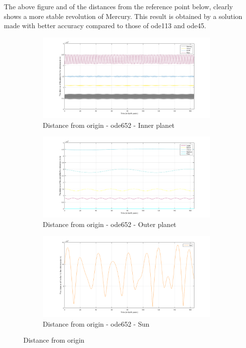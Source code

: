 \documentclass[a4paper]{article}
\begin{document}
The above figure and of the distances from the reference point below, clearly shows a more stable revolution of Mercury. This result is obtained by a solution made with better accuracy compared to those of ode113 and ode45.

\begin{figure}[H]
\centering
\begin{subfigure}{.5\textwidth}
\centering
\includegraphics[width=1\textwidth]{Solar_System_-_ode652_-_ip.png}
\caption{Distance from origin - ode652 - Inner planet}
\label{fig:Solar_System_-_ode652_-_ip}
\end{subfigure}%
\begin{subfigure}{.5\textwidth}
\centering
\includegraphics[width=1\textwidth]{Solar_System_-_ode652_-_op.png}
\caption{Distance from origin - ode652 - Outer planet}
\label{fig:Solar_System_-_ode652_-_op}
\end{subfigure}
\begin{subfigure}{.7\textwidth}
\centering
\includegraphics[width=1\textwidth]{Solar_System_-_ode652_-_sun.png}
\caption{Distance from origin - ode652 - Sun}
\label{fig:Solar_System_-_ode652_-_sun}
\end{subfigure} 
\caption{Distance from origin}
\label{fig:Solar_System_-_ode652_-_all}
\end{figure} 
\end{document}
